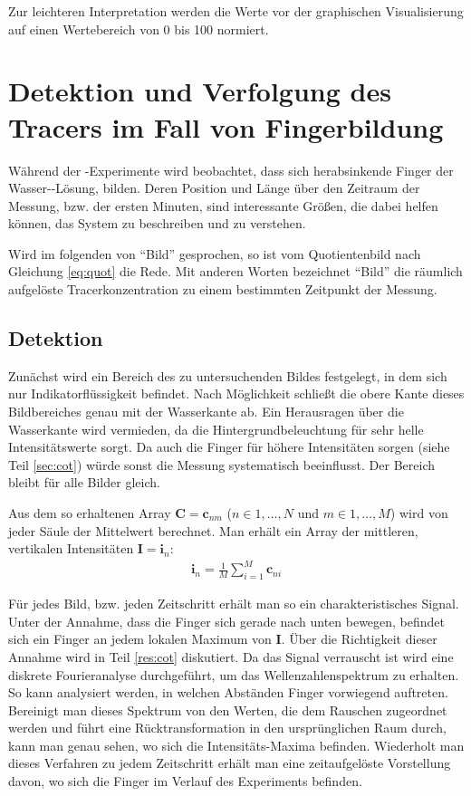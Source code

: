 Zur leichteren Interpretation werden die Werte vor der graphischen Visualisierung auf einen Wertebereich von 0 bis 100 normiert.

\section{Detektion und Verfolgung des Tracers im Fall von Fingerbildung}
\label{sec:track}
Während der \COT-Experimente wird beobachtet, dass sich herabsinkende Finger der Wasser-\COT-Lösung, bilden. Deren Position und Länge über den Zeitraum der 
Messung, bzw. der ersten Minuten, sind interessante Größen, die dabei helfen können, das System zu beschreiben und zu verstehen.

Wird im folgenden von ``Bild'' gesprochen, so ist vom Quotientenbild nach Gleichung \ref{eq:quot} die Rede. Mit anderen Worten bezeichnet ``Bild'' die räumlich 
aufgelöste Tracerkonzentration zu einem bestimmten Zeitpunkt der Messung.

\subsection{Detektion}
\label{sec:dec}
Zunächst wird ein Bereich des zu untersuchenden Bildes festgelegt, in dem sich nur Indikatorflüssigkeit befindet. Nach Möglichkeit schließt die obere Kante 
dieses Bildbereiches genau mit der Wasserkante ab. Ein Herausragen über die Wasserkante wird vermieden, da die Hintergrundbeleuchtung für sehr helle 
Intensitätswerte sorgt. Da auch die Finger für höhere Intensitäten sorgen (siehe Teil \ref{sec:cot}) würde sonst die Messung systematisch beeinflusst. Der 
Bereich bleibt für alle Bilder gleich.

Aus dem so erhaltenen Array $\mathbf{C} = \mathbf{c}_{nm}$ ($n \in 1,\dots,N$ und $m \in 1,\dots,M$) wird von jeder Säule der Mittelwert berechnet. Man erhält 
ein Array der mittleren, vertikalen Intensitäten $\mathbf{I} = \mathbf{i}_{n}$:
\begin{eqnarray}
 \mathbf{i}_{n} = \frac{1}{M} \sum_{i=1}^{M} \mathbf{c}_{ni}
\end{eqnarray}

Für jedes Bild, bzw. jeden Zeitschritt erhält man so ein charakteristisches Signal. Unter der Annahme, dass die Finger sich gerade nach unten bewegen, befindet 
sich ein Finger an jedem lokalen Maximum von $\mathbf{I}$. Über die Richtigkeit dieser Annahme wird in Teil \ref{res:cot} diskutiert.
Da das Signal verrauscht ist wird eine diskrete Fourieranalyse durchgeführt, um das Wellenzahlenspektrum zu erhalten. So kann analysiert werden, in welchen 
Abständen Finger vorwiegend auftreten. Bereinigt man dieses Spektrum von den Werten, die dem Rauschen zugeordnet werden und führt eine Rücktransformation in den 
ursprünglichen Raum durch, kann man genau sehen, wo sich die Intensitäts-Maxima befinden. Wiederholt man dieses Verfahren zu jedem Zeitschritt erhält man eine 
zeitaufgelöste Vorstellung davon, wo sich die Finger im Verlauf des Experiments befinden.

